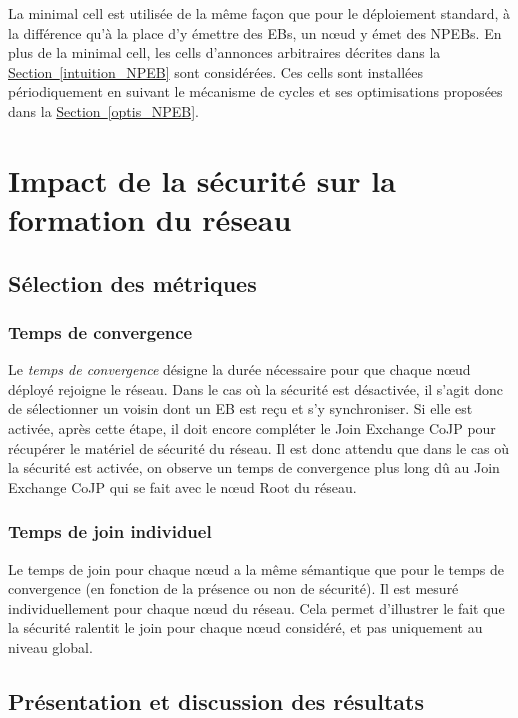 \documentclass[]{report}
\newcommand{\wordlink}[2]{\hyperref[#2]{#1~\ref{#2}}}
\begin{document}
\vspace{0.3cm}

La minimal cell est utilisée de la même façon que pour le déploiement standard, à la différence qu'à la place d'y émettre des EBs, un nœud y émet des NPEBs. En plus de la minimal cell, les cells d'annonces arbitraires décrites dans la \wordlink{Section}{intuition_NPEB} sont considérées. Ces cells sont installées périodiquement en suivant le mécanisme de cycles et ses optimisations proposées dans la \wordlink{Section}{optis_NPEB}.

\newpage

\section{Impact de la sécurité sur la formation du réseau}
\label{impact_secjoin}

\subsection{Sélection des métriques}

\subsubsection{Temps de convergence}

Le \textit{temps de convergence} désigne la durée nécessaire pour que chaque nœud déployé  rejoigne le réseau. Dans le cas où la sécurité est désactivée, il s'agit donc de sélectionner un voisin dont un EB est reçu et s'y synchroniser. Si elle est activée, après cette étape, il doit encore compléter le Join Exchange CoJP pour récupérer le matériel de sécurité du réseau. Il est donc attendu que dans le cas où la sécurité est activée, on observe un temps de convergence plus long dû au Join Exchange CoJP qui se fait avec le nœud Root du réseau.

\subsubsection{Temps de join individuel}

Le temps de join pour chaque nœud a la même sémantique que pour le temps de convergence (en fonction de la présence ou non de sécurité). Il est mesuré individuellement pour chaque nœud du réseau. Cela permet d'illustrer le fait que la sécurité ralentit le join pour chaque nœud considéré, et pas uniquement au niveau global.

\subsection{Présentation et discussion des résultats}
\end{document}
